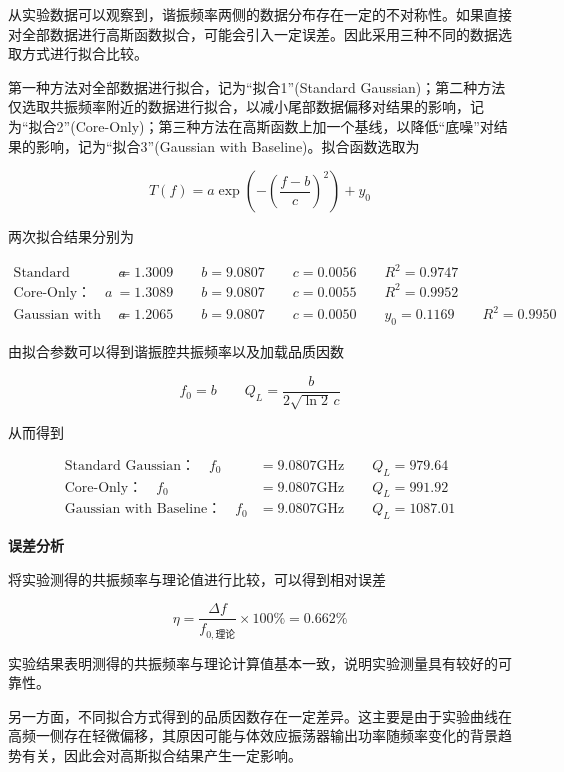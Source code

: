 \documentclass[a4paper, 1.5lines]{ctexart}
\begin{document}
从实验数据可以观察到，谐振频率两侧的数据分布存在一定的不对称性。如果直接对全部数据进行高斯函数拟合，可能会引入一定误差。因此采用三种不同的数据选取方式进行拟合比较。

第一种方法对全部数据进行拟合，记为“拟合1”(Standard Gaussian)；第二种方法仅选取共振频率附近的数据进行拟合，以减小尾部数据偏移对结果的影响，记为“拟合2”(Core-Only)；第三种方法在高斯函数上加一个基线，以降低“底噪”对结果的影响，记为“拟合3”(Gaussian with Baseline)。拟合函数选取为

\begin{equation*}
T(f)= a \exp\left(-\left(\frac{f-b}{c}\right)^2\right) + y_0
\end{equation*}

两次拟合结果分别为

\begin{align*}
\text{Standard Gaussian：}\quad a&=1.3009 \qquad b=9.0807 \qquad c=0.0056 \qquad R^2=0.9747 \\
\text{Core-Only：}\quad a&=1.3089 \qquad b=9.0807 \qquad c=0.0055 \qquad R^2=0.9952 \\
\text{Gaussian with Baseline：}\quad a&=1.2065 \qquad b=9.0807 \qquad c=0.0050 \qquad y_0 = 0.1169 \qquad R^2=0.9950
\end{align*}

由拟合参数可以得到谐振腔共振频率以及加载品质因数

\[
f_0=b \qquad 
Q_L=\frac{b}{2\sqrt{\ln2}\,c}
\]

从而得到

\begin{align*}
\text{Standard Gaussian：}\quad f_0&=9.0807\mathrm{GHz} \qquad Q_L=979.64 \\
\text{Core-Only：}\quad f_0&=9.0807\mathrm{GHz} \qquad Q_L=991.92 \\
\text{Gaussian with Baseline：}\quad f_0&=9.0807\mathrm{GHz} \qquad Q_L=1087.01
\end{align*}

\textbf{误差分析}

将实验测得的共振频率与理论值进行比较，可以得到相对误差

\[
\eta = \frac{\Delta f}{f_{0,\text{理论}}}\times100\% = 0.662\%
\]

实验结果表明测得的共振频率与理论计算值基本一致，说明实验测量具有较好的可靠性。

另一方面，不同拟合方式得到的品质因数存在一定差异。这主要是由于实验曲线在高频一侧存在轻微偏移，其原因可能与体效应振荡器输出功率随频率变化的背景趋势有关，因此会对高斯拟合结果产生一定影响。
\end{document}
